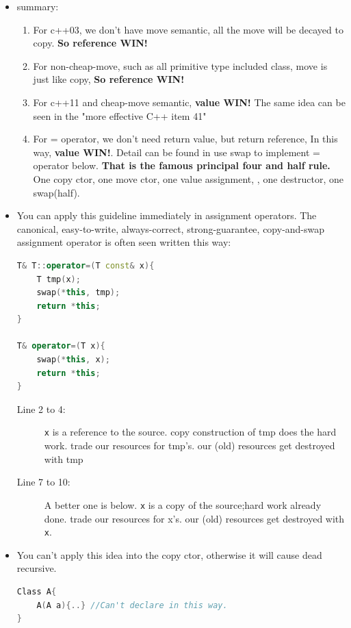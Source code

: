 \documentclass[a4paper,11pt,twoside]{book}
\begin{document}
\begin{itemize}
\item summary:
\begin{enumerate}
	\item For c++03, we don't have move semantic, all the move will be decayed to copy. \textbf{So reference WIN!}
	
	\item For non-cheap-move, such as all primitive type included class, move is just like copy, \textbf{So reference WIN!}
	
	\item For c++11 and cheap-move semantic, \textbf{value WIN!} The same idea can be seen in the "more effective C++ item 41" 
	
	\item For = operator, we don't need return value, but return reference, In this way, \textbf{value WIN!}. Detail can be found in use swap to implement = operator below. \textbf{That is the famous principal four and half rule.} One copy ctor, one move ctor, one value assignment, , one destructor, one swap(half).
	
\end{enumerate}

\item You can apply this guideline immediately in assignment operators. The canonical, easy-to-write, always-correct, strong-guarantee, copy-and-swap assignment operator is often seen written this way:
\begin{lstlisting}[frame=single, language=c++]
T& T::operator=(T const& x){ 
	T tmp(x);          
	swap(*this, tmp);  
	return *this;      
}

T& operator=(T x){ 
	swap(*this, x);
	return *this;   
}
\end{lstlisting}
\begin{description}
	\item[Line 2 to 4:] \texttt{x} is a reference to the source. copy construction of tmp does the hard work. trade our resources for tmp's. our (old) resources get destroyed with tmp 
	
	\item[Line 7 to 10:] A better one is below. \texttt{x} is a copy of the source;hard work already done. trade our resources for x's. our (old) resources get destroyed with \texttt{x}.
\end{description}

\item You can't apply this idea into the copy ctor, otherwise it will cause dead recursive.
\begin{lstlisting}[frame=single, language=c++]
Class A{
	A(A a){..} //Can't declare in this way.
}
\end{lstlisting}


\end{itemize}
\end{document}
